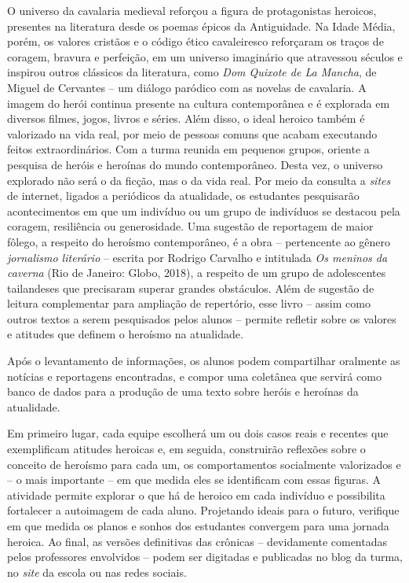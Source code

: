 \documentclass[11pt]{extarticle}
\begin{document}
  O universo da cavalaria medieval reforçou a figura de protagonistas
  heroicos, presentes na literatura desde os poemas épicos da
  Antiguidade. Na Idade Média, porém, os valores cristãos e o código
  ético cavaleiresco reforçaram os traços de coragem, bravura e
  perfeição, em um universo imaginário que atravessou séculos e inspirou
  outros clássicos da literatura, como \emph{Dom Quixote de La Mancha},
  de Miguel de Cervantes -- um diálogo paródico com as novelas de
  cavalaria. A imagem do herói continua presente na cultura
  contemporânea e é explorada em diversos filmes, jogos, livros e
  séries. Além disso, o ideal heroico também é valorizado na vida real,
  por meio de pessoas comuns que acabam executando feitos
  extraordinários. Com a turma reunida em pequenos grupos, oriente a
  pesquisa de heróis e heroínas do mundo contemporâneo. Desta vez, o
  universo explorado não será o da ficção, mas o da vida real. Por meio
  da consulta a \emph{sites} de internet, ligados a periódicos da
  atualidade, os estudantes pesquisarão acontecimentos em que um
  indivíduo ou um grupo de indivíduos se destacou pela coragem,
  resiliência ou generosidade. Uma sugestão de reportagem de maior
  fôlego, a respeito do heroísmo contemporâneo, é a obra -- pertencente
  ao gênero \emph{jornalismo literário} -- escrita por Rodrigo Carvalho
  e intitulada \emph{Os meninos da caverna} (Rio de Janeiro: Globo,
  2018), a respeito de um grupo de adolescentes tailandeses que
  precisaram superar grandes obstáculos. Além de sugestão de leitura
  complementar para ampliação de repertório, esse livro -- assim como
  outros textos a serem pesquisados pelos alunos -- permite refletir
  sobre os valores e atitudes que definem o heroísmo na atualidade.

Após o levantamento de informações, os alunos podem
compartilhar oralmente as notícias e reportagens encontradas, e compor
uma coletânea que servirá como banco de dados para a produção de uma
texto sobre heróis e heroínas da atualidade. 


Em primeiro lugar, cada equipe escolherá um ou dois casos reais e recentes
que exemplificam atitudes heroicas e, em seguida, construirão reflexões
sobre o conceito de heroísmo para cada um, os comportamentos socialmente
valorizados e -- o mais importante -- em que medida eles se identificam
com essas figuras. A atividade permite explorar o que há de heroico em
cada indivíduo e possibilita fortalecer a autoimagem de cada aluno.
Projetando ideais para o futuro, verifique em que medida os planos e
sonhos dos estudantes convergem para uma jornada heroica. Ao final, as
versões definitivas das crônicas -- devidamente comentadas pelos
professores envolvidos -- podem ser digitadas e publicadas no blog da
turma, no \emph{site} da escola ou nas redes sociais.
\end{document}

